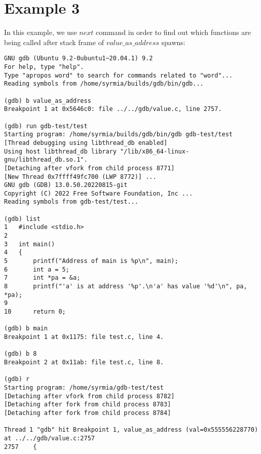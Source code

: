 \documentclass{report}
\begin{document}
\section *{Example 3}
In this example, we use $next$ command in order to find out which functions are being called after stack frame of $value\_as\_address$ spawns:
\begin{verbatim}
GNU gdb (Ubuntu 9.2-0ubuntu1~20.04.1) 9.2
For help, type "help".
Type "apropos word" to search for commands related to "word"...
Reading symbols from /home/syrmia/builds/gdb/bin/gdb...

(gdb) b value_as_address
Breakpoint 1 at 0x5646c0: file ../../gdb/value.c, line 2757.

(gdb) run gdb-test/test
Starting program: /home/syrmia/builds/gdb/bin/gdb gdb-test/test
[Thread debugging using libthread_db enabled]
Using host libthread_db library "/lib/x86_64-linux-gnu/libthread_db.so.1".
[Detaching after vfork from child process 8771]
[New Thread 0x7ffff49fc700 (LWP 8772)] ...
GNU gdb (GDB) 13.0.50.20220815-git
Copyright (C) 2022 Free Software Foundation, Inc ...
Reading symbols from gdb-test/test...

(gdb) list
1	#include <stdio.h>
2	
3	int main()
4	{
5		printf("Address of main is %p\n", main);
6		int a = 5;
7		int *pa = &a;
8		printf("'a' is at address '%p'.\n'a' has value '%d'\n", pa, *pa);
9	
10		return 0;

(gdb) b main
Breakpoint 1 at 0x1175: file test.c, line 4.

(gdb) b 8
Breakpoint 2 at 0x11ab: file test.c, line 8.

(gdb) r
Starting program: /home/syrmia/gdb-test/test 
[Detaching after vfork from child process 8782]
[Detaching after fork from child process 8783]
[Detaching after fork from child process 8784]

Thread 1 "gdb" hit Breakpoint 1, value_as_address (val=0x555556228770) at ../../gdb/value.c:2757
2757	{


\end{verbatim}
\end{document}
